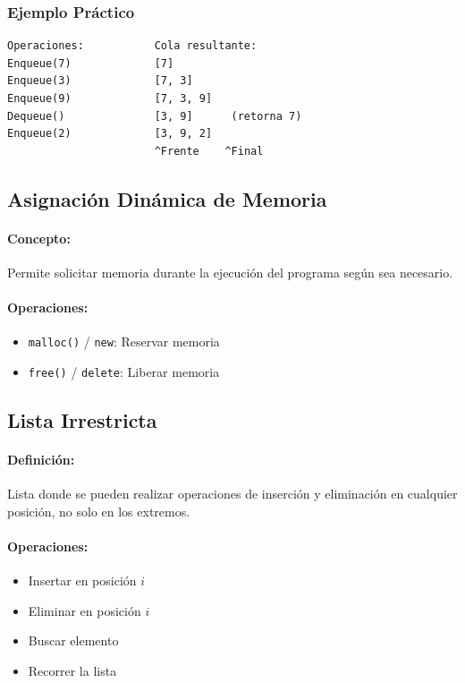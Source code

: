 \documentclass[12pt,a4paper]{article}
\begin{document}
\subsubsection{Ejemplo Práctico}
\begin{verbatim}
Operaciones:           Cola resultante:
Enqueue(7)             [7]
Enqueue(3)             [7, 3]
Enqueue(9)             [7, 3, 9]
Dequeue()              [3, 9]      (retorna 7)
Enqueue(2)             [3, 9, 2]
                       ^Frente    ^Final
\end{verbatim}

\subsection{Asignación Dinámica de Memoria}

\paragraph{Concepto:}
Permite solicitar memoria durante la ejecución del programa según sea necesario.

\paragraph{Operaciones:}
\begin{itemize}
    \item \texttt{malloc()} / \texttt{new}: Reservar memoria
    \item \texttt{free()} / \texttt{delete}: Liberar memoria
\end{itemize}

\subsection{Lista Irrestricta}

\paragraph{Definición:}
Lista donde se pueden realizar operaciones de inserción y eliminación en cualquier posición, no solo en los extremos.

\paragraph{Operaciones:}
\begin{itemize}
    \item Insertar en posición $i$
    \item Eliminar en posición $i$
    \item Buscar elemento
    \item Recorrer la lista
\end{itemize}
\end{document}
